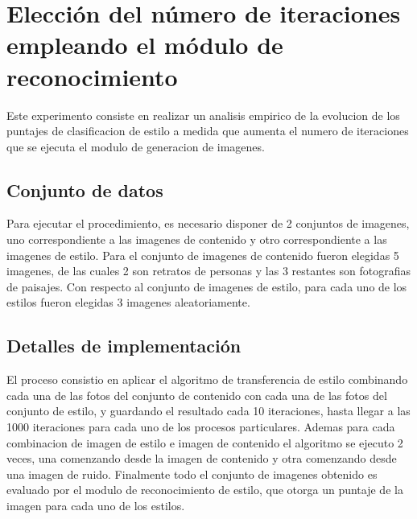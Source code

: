 \documentclass[a4paper,11pt,spanish]{book}
\begin{document}
  \section{Elección del número de iteraciones empleando el módulo de reconocimiento}
    Este experimento consiste en realizar un analisis empirico de la evolucion de los puntajes de clasificacion de estilo a medida que aumenta el numero de iteraciones
    que se ejecuta el modulo de generacion de imagenes.
    \subsection{Conjunto de datos}
      Para ejecutar el procedimiento, es necesario disponer de 2 conjuntos de imagenes, uno correspondiente a las imagenes de contenido y otro correspondiente a las imagenes de estilo.
      Para el conjunto de imagenes de contenido fueron elegidas 5 imagenes, de las cuales 2 son retratos de personas y las 3 restantes son fotografias de paisajes.
      Con respecto al conjunto de imagenes de estilo, para cada uno de los estilos fueron elegidas 3 imagenes aleatoriamente.
    \subsection{Detalles de implementación}
      El proceso consistio en aplicar el algoritmo de transferencia de estilo combinando cada una de las fotos del conjunto de contenido con cada una de las fotos del conjunto de estilo,
      y guardando el resultado cada 10 iteraciones, hasta llegar a las 1000 iteraciones para cada uno de los procesos particulares.
      Ademas para cada combinacion de imagen de estilo e imagen de contenido el algoritmo se ejecuto 2 veces, una comenzando desde la imagen de contenido y otra comenzando desde una imagen de ruido.
      Finalmente todo el conjunto de imagenes obtenido es evaluado por el modulo de reconocimiento de estilo, que otorga un puntaje de la imagen para cada uno de los estilos.
\end{document}
